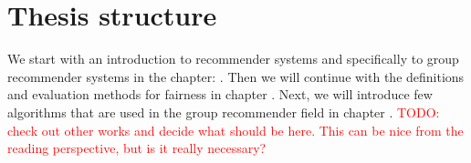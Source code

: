 \section{Thesis structure}

We start with an introduction to recommender systems and specifically to group recommender systems in the chapter: . Then we will continue with the definitions and evaluation methods for fairness in chapter . Next, we will introduce few algorithms that are used in the group recommender field in chapter .
\textcolor{red}{TODO: check out other works and decide what should be here. This can be nice from the reading perspective, but is it really necessary?}


